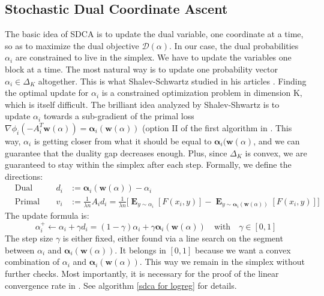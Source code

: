 \documentclass{article}
\DeclareMathOperator{\1}{\mathbb{1}}
\DeclareMathOperator{\E}{\mathbf{E}}
\begin{document}
\subsection{Stochastic Dual Coordinate Ascent}
The basic idea of SDCA is to update the dual variable, one coordinate at a time, so as to maximize the dual objective $\mathscr D(\alpha)$.
In our case, the dual probabilities $\alpha_i$ are constrained to live in the simplex.
We have to update the variables one block at a time.
The most natural way is to update one probability vector $\alpha_i \in \Delta_K$ altogether.
This is what Shalev-Schwartz studied in his articles \cite{shalev-shwartz_accelerated_2013-1}.
Finding the optimal update for $\alpha_i$ is a constrained optimization problem in dimension K, which is itself difficult. 
The brilliant idea analyzed by Shalev-Shwartz is to update $\alpha_i$ towards a sub-gradient of the primal loss $\nabla\phi_i( - A_i^T\bm w(\alpha)) = \bm \alpha_i(\bm w(\alpha))$ (option II of the first algorithm in \cite{shalev-shwartz_accelerated_2013-1}.
This way, $\alpha_i$ is getting closer from what it should be equal to $\bm \alpha_i(\bm w(\alpha)$, and we can guarantee that the duality gap decreases enough.
Plus, since $\Delta_K$ is convex, we are guaranteed to stay within the simplex after each step.  
Formally, we define the directions:
\begin{align*}
	& \textrm{Dual ascent direction:} &  d_i &:= \bm \alpha_i(\bm w(\alpha)) - \alpha_i \\
	&\textrm{Primal direction:} &  v_i &:= \frac{1}{\lambda n} A_i d_i  = \frac{1}{\lambda n} \big [ \E_{y \sim \alpha_i} [F(x_i, y)] - \E_{y \sim  \bm \alpha_i(\bm w(\alpha)) } [F(x_i, y)] \big ]
\end{align*} 
The update formula is:
\begin{equation*}
	\alpha_i^+ \leftarrow \alpha_i + \gamma d_i = (1-\gamma)\alpha_i + \gamma \bm \alpha_i(\bm w(\alpha)) \quad \textrm{with} \quad \gamma \in [0,1]
\end{equation*}
The step size $\gamma$ is either fixed, either found via a line search on the segment between $\alpha_i$ and $\bm \alpha_i(\bm w(\alpha))$. 
It belongs in $[0,1]$ because we want a convex combination of $\alpha_i$ and $\bm \alpha_i(\bm w(\alpha))$.
This way we remain in the simplex without further checks. 
Most importantly, it is necessary for the proof of the linear convergence rate in \cite{shalev-shwartz_accelerated_2013-1}. 
See algorithm \ref{sdca for logreg} for details.
\end{document}
